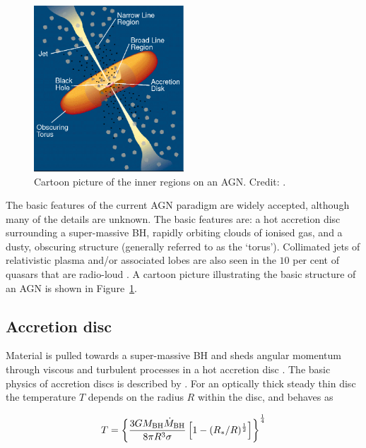 \begin{figure}
  \centering
  \includegraphics[width=0.5\textwidth]{figures/chapter05/urry_model}
  \caption[{Cartoon picture of the inner regions on an AGN.}]{Cartoon picture of the inner regions on an AGN. Credit: \citet{urry95}.}
  \label{fig:agnmodel}
\end{figure}

The basic features of the current AGN paradigm are widely accepted, although many of the details are unknown.
The basic features are: a hot accretion disc surrounding a super-massive BH, rapidly orbiting clouds of ionised gas, and a dusty, obscuring structure (generally referred to as the `torus').
Collimated jets of relativistic plasma and/or associated lobes are also seen in the $10$ per cent of quasars that are radio-loud \citep[e.g.][]{peterson97}.
A cartoon picture illustrating the basic structure of an AGN is shown in Figure~\ref{fig:agnmodel}.

\subsection{Accretion disc}

Material is pulled towards a super-massive BH and sheds angular momentum through viscous and turbulent processes in a hot accretion disc \citep[e.g.][]{begelman85}.
The basic physics of accretion discs is described by \citet{pringle81}.
For an optically thick steady thin disc the temperature $T$ depends on the radius $R$ within the disc, and behaves as

\begingroup\makeatletter{}\check@mathfonts
\begin{eqnarray}
T = \left\{
\frac {3GM_{\text{BH}}\dot M_{\text{BH}}} {8 \pi R^3 \sigma} \left[ 1- (R_*/R)^{1\over2} \right]
\right\}^{1\over 4}
\end{eqnarray}
\endgroup

